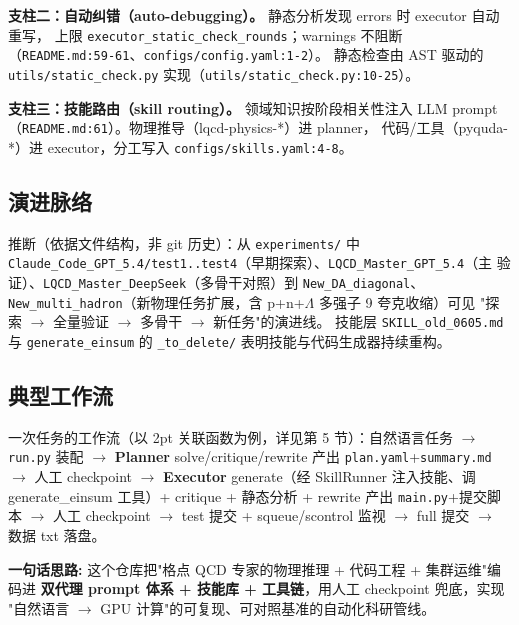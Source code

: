 \documentclass[UTF8]{ctexart}
\begin{document}
\textbf{支柱二：自动纠错（auto-debugging）。} 静态分析发现 errors 时 executor 自动重写，
上限 \texttt{executor\_static\_check\_rounds}；warnings 不阻断
（\texttt{\nolinkurl{README.md:59-61}}、\texttt{\nolinkurl{configs/config.yaml:1-2}}）。
静态检查由 AST 驱动的 \texttt{utils/static\_check.py} 实现（\texttt{\nolinkurl{utils/static_check.py:10-25}}）。

\textbf{支柱三：技能路由（skill routing）。} 领域知识按阶段相关性注入 LLM prompt
（\texttt{\nolinkurl{README.md:61}}）。物理推导（lqcd-physics-*）进 planner，
代码/工具（pyquda-*）进 executor，分工写入 \texttt{configs/skills.yaml:4-8}。

\subsection{演进脉络}

\textcolor{relation}{推断}（依据文件结构，非 git 历史）：从 \texttt{experiments/} 中
\texttt{Claude\_Code\_GPT\_5.4/test1..test4}（早期探索）、\texttt{LQCD\_Master\_GPT\_5.4}（主
验证）、\texttt{LQCD\_Master\_DeepSeek}（多骨干对照）到 \texttt{New\_DA\_diagonal}、
\texttt{New\_multi\_hadron}（新物理任务扩展，含 p+n+$\Lambda$ 多强子 9 夸克收缩）可见
"探索 $\rightarrow$ 全量验证 $\rightarrow$ 多骨干 $\rightarrow$ 新任务"的演进线。
技能层 \texttt{SKILL\_old\_0605.md} 与 \texttt{generate\_einsum} 的 \texttt{\_to\_delete/}
表明技能与代码生成器持续重构。

\subsection{典型工作流}

一次任务的工作流（以 2pt 关联函数为例，详见第 5 节）：自然语言任务
$\rightarrow$ \texttt{run.py} 装配 $\rightarrow$ \textbf{Planner} solve/critique/rewrite 产出
\texttt{plan.yaml}+\texttt{summary.md} $\rightarrow$ 人工 checkpoint $\rightarrow$ \textbf{Executor}
generate（经 SkillRunner 注入技能、调 generate\_einsum 工具）+ critique + 静态分析 +
rewrite 产出 \texttt{main.py}+提交脚本 $\rightarrow$ 人工 checkpoint $\rightarrow$ test 提交 +
squeue/scontrol 监视 $\rightarrow$ full 提交 $\rightarrow$ 数据 txt 落盘。

\begin{ideabox}
\textbf{一句话思路:} 这个仓库把"格点 QCD 专家的物理推理 + 代码工程 + 集群运维"编码进
\textbf{双代理 prompt 体系 + 技能库 + 工具链}，用人工 checkpoint 兜底，实现
"自然语言 $\rightarrow$ GPU 计算"的可复现、可对照基准的自动化科研管线。
\end{ideabox}
\end{document}
